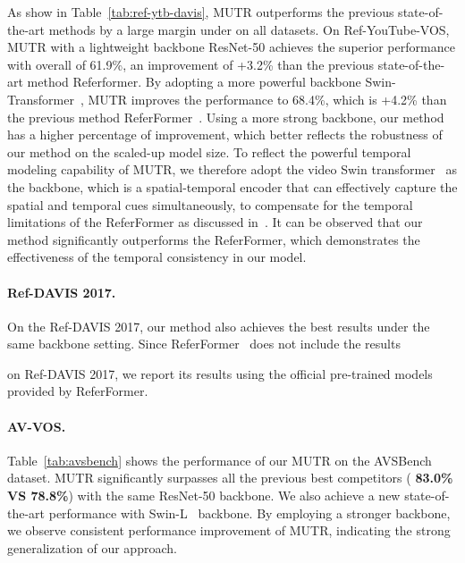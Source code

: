 \documentclass{article}
\begin{document}
As show in Table~\ref{tab:ref-ytb-davis}, MUTR outperforms the previous state-of-the-art methods by a large margin under on all datasets. On Ref-YouTube-VOS, MUTR with a lightweight backbone ResNet-50 achieves the superior performance with overall  of 61.9\%, an improvement of +3.2\% than the previous state-of-the-art method Referformer. 
By adopting a more powerful backbone Swin-Transformer~\cite{liu2021swin}, MUTR improves the performance to  68.4\%, which is +4.2\%  than the previous method ReferFormer~\cite{wu2022language}. Using a more strong backbone, our method has a higher percentage of improvement, which better reflects the robustness of our method on the scaled-up model size. 
To reflect the powerful temporal modeling capability of MUTR, we therefore adopt the video Swin transformer~\cite{liu2022video} as the backbone, which is a spatial-temporal encoder that can effectively capture the spatial and temporal cues simultaneously, to compensate for the temporal limitations of the ReferFormer as discussed in~\cite{hu20221st}. It can be observed that our method significantly outperforms the ReferFormer, which demonstrates the effectiveness of the temporal consistency in our model.


\paragraph{Ref-DAVIS 2017.} On the Ref-DAVIS 2017, our method also achieves the best results under the same backbone setting. Since ReferFormer~\cite{wu2022language} does not include the results

on Ref-DAVIS 2017, we report its results using the official pre-trained models provided by ReferFormer.

\paragraph{AV-VOS.} Table~\ref{tab:avsbench} shows the performance of our MUTR on the AVSBench dataset. MUTR significantly surpasses all the previous best competitors  ( \textbf{83.0\% VS 78.8\%}) with the same ResNet-50 backbone. We also achieve a new state-of-the-art performance with Swin-L~\cite{liu2021swin} backbone.
By employing a stronger backbone, we observe consistent performance improvement of MUTR, indicating the strong generalization of our approach.
\end{document}
